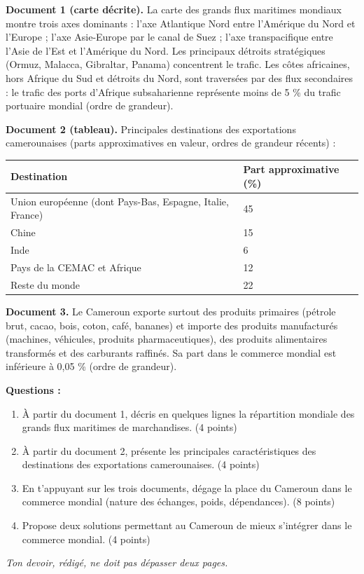 \documentclass[11pt]{article}
\begin{document}
\begin{exercice}
\textbf{Document 1 (carte décrite).} La carte des grands flux maritimes mondiaux montre trois axes dominants : l'axe Atlantique Nord entre l'Amérique du Nord et l'Europe ; l'axe Asie-Europe par le canal de Suez ; l'axe transpacifique entre l'Asie de l'Est et l'Amérique du Nord. Les principaux détroits stratégiques (Ormuz, Malacca, Gibraltar, Panama) concentrent le trafic. Les côtes africaines, hors Afrique du Sud et détroits du Nord, sont traversées par des flux secondaires : le trafic des ports d'Afrique subsaharienne représente moins de 5 \% du trafic portuaire mondial (ordre de grandeur).

\textbf{Document 2 (tableau).} Principales destinations des exportations camerounaises (parts approximatives en valeur, ordres de grandeur récents) :
\begin{center}
\begin{tabularx}{\linewidth}{|l|X|}\hline
\rowcolor{popblueL} \textbf{Destination} & \textbf{Part approximative (\%)} \\ \hline
Union européenne (dont Pays-Bas, Espagne, Italie, France) & 45 \\ \hline
Chine & 15 \\ \hline
Inde & 6 \\ \hline
Pays de la CEMAC et Afrique & 12 \\ \hline
Reste du monde & 22 \\ \hline
\end{tabularx}
\end{center}

\textbf{Document 3.} Le Cameroun exporte surtout des produits primaires (pétrole brut, cacao, bois, coton, café, bananes) et importe des produits manufacturés (machines, véhicules, produits pharmaceutiques), des produits alimentaires transformés et des carburants raffinés. Sa part dans le commerce mondial est inférieure à 0,05 \% (ordre de grandeur).

\textbf{Questions :}
\begin{enumerate}
\item À partir du document 1, décris en quelques lignes la répartition mondiale des grands flux maritimes de marchandises. (4 points)
\item À partir du document 2, présente les principales caractéristiques des destinations des exportations camerounaises. (4 points)
\item En t'appuyant sur les trois documents, dégage la place du Cameroun dans le commerce mondial (nature des échanges, poids, dépendances). (8 points)
\item Propose deux solutions permettant au Cameroun de mieux s'intégrer dans le commerce mondial. (4 points)
\end{enumerate}
\emph{Ton devoir, rédigé, ne doit pas dépasser deux pages.}
\end{exercice}
\end{document}
